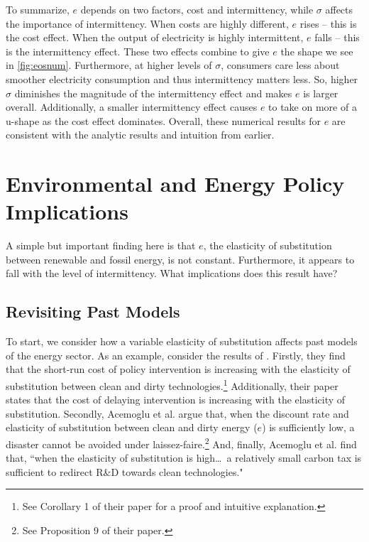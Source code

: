 \documentclass[11pt,a4paper,leqno]{extarticle}
\begin{document}
	To summarize, $e$ depends on two factors, cost and intermittency, while $\sigma$ affects the importance of intermittency. When costs are highly different, $e$ rises -- this is the cost effect. When the output of electricity is highly intermittent, $e$ falls -- this is the intermittency effect. These two effects combine to give $e$ the shape we see in \autoref{fig:eosnum}. Furthermore, at higher levels of $\sigma$, consumers care less about smoother electricity consumption and thus intermittency matters less. So, higher $\sigma$ diminishes the magnitude of the intermittency effect and makes  $e$ is larger overall. Additionally, a smaller intermittency effect causes  $e$ to take on more of a u-shape as the cost effect dominates. Overall, these numerical results for $e$ are consistent with the analytic results and intuition from earlier. 
	

	
	
	\section{Environmental and Energy Policy Implications}
	
	A simple but important finding here is that $e$, the elasticity of substitution between  renewable and fossil energy, is not constant. Furthermore, it appears to fall with the level of intermittency. What implications does this result have?
	
	\subsection{Revisiting Past Models}
	
	To start, we consider how  a variable elasticity of substitution affects past models of the energy sector. As an example, consider the results of \citet{Ace2012}. Firstly, they find that the short-run cost of policy intervention is increasing with the elasticity of substitution between clean and dirty technologies.\footnote{ See Corollary 1 of their paper for a proof and intuitive explanation.} Additionally, their paper states that the cost of delaying intervention is increasing with the elasticity of substitution. Secondly, Acemoglu et al. argue that, when the discount rate and elasticity of substitution between clean and dirty energy ($e$) is sufficiently low, a disaster cannot be avoided under laissez-faire.\footnote{ See Proposition 9 of their paper.} And, finally, Acemoglu et al. find that, ``when the elasticity of substitution is high\dots\, a relatively small carbon tax is sufficient to redirect R\&D towards clean technologies."
	
\end{document}
